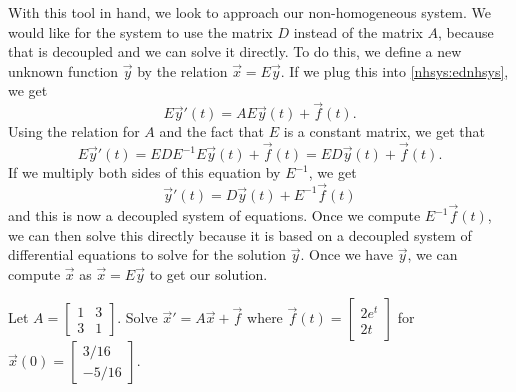 \documentclass{ximera}
\begin{document}
With this tool in hand, we look to approach our non-homogeneous system. We would like for the system to use the matrix $D$ instead of the matrix $A$, because that is decoupled and we can solve it directly. To do this, we define a new unknown function $\vec{y}$ by the relation $\vec{x} = E\vec{y}$. If we plug this into \eqref{nhsys:ednhsys}, we get
\begin{equation*}
    {E\vec{y}}' (t) = A E\vec{y}(t) + \vec{f}(t).
\end{equation*} 
Using the relation for $A$ and the fact that $E$ is a constant matrix, we get that
\begin{equation*}
    E{\vec{y}}' (t) = EDE^{-1} E \vec{y}(t) + \vec{f}(t) = ED\vec{y}(t) + \vec{f}(t).
\end{equation*}
If we multiply both sides of this equation by $E^{-1}$, we get
\begin{equation*}
    {\vec{y}}' (t) = D\vec{y}(t) + E^{-1}\vec{f}(t)
\end{equation*}
and this is now a decoupled system of equations. Once we compute $E^{-1}\vec{f}(t)$, we can then solve this directly because it is based on a decoupled system of differential equations to solve for the solution $\vec{y}$. Once we have $\vec{y}$, we can compute $\vec{x}$ as $\vec{x} = E\vec{y}$ to get our solution. 

\begin{example}
    Let $A = \left[
    \begin{smallmatrix}
        1 & 3 \\
        3 & 1
    \end{smallmatrix} \right]$.
    Solve ${\vec{x}}' = A \vec{x} + \vec{f}$ where $\vec{f}(t) = 
    \left[ \begin{smallmatrix}
        2e^t \\
        2t
    \end{smallmatrix} 
    \right]$ for $\vec{x}(0) =
    \left[ \begin{smallmatrix}
        3/16 \\
        -5/16
    \end{smallmatrix} \right]$.
\end{example}
\end{document}
